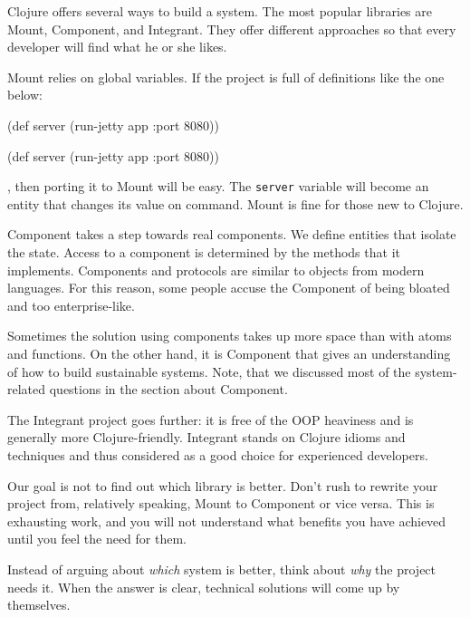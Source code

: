 Clojure offers several ways to build a system. The most popular libraries are Mount, Component, and Integrant. They offer different approaches so that every developer will find what he or she likes.

Mount relies on global variables. If the project is full of definitions like the one below:

\ifnarrow

\begin{english}
  \begin{clojure}
(def server
  (run-jetty app {:port 8080}))
  \end{clojure}
\end{english}

\else

\begin{english}
  \begin{clojure}
(def server (run-jetty app {:port 8080}))
  \end{clojure}
\end{english}

\fi

\noindent
, then porting it to Mount will be easy. The \verb|server| variable will become an entity that changes its value on command. Mount is fine for those new to Clojure.

Component takes a step towards real components. We define entities that isolate the state. Access to a component is determined by the methods that it implements. Components and protocols are similar to objects from modern languages. For this reason, some people accuse the Component of being bloated and too enterprise-like.

Sometimes the solution using components takes up more space than with atoms and functions. On the other hand, it is Component that gives an understanding of how to build sustainable systems. Note, that we discussed most of the system-related questions in the section about Component.

The Integrant project goes further: it is free of the OOP heaviness and is generally more Clojure-friendly. Integrant stands on Clojure idioms and techniques and thus considered as a good choice for experienced developers.

Our goal is not to find out which library is better. Don't rush to rewrite your project from, relatively speaking, Mount to Component or vice versa. This is exhausting work, and you will not understand what benefits you have achieved until you feel the need for them.

Instead of arguing about \emph{which} system is better, think about \emph{why} the project needs it. When the answer is clear, technical solutions will come up by themselves.
